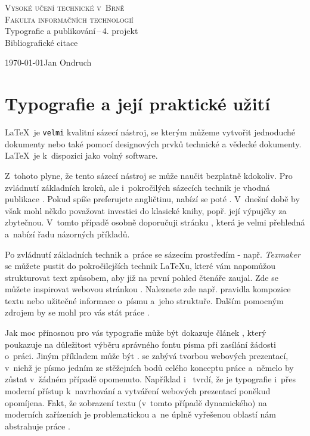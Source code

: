 \documentclass[11pt,a4paper,oneside]{article}
\begin{document}
\begin{titlepage}
\begin{center}

{\Huge\textsc{{Vysoké učení technické v~Brně}}}\\
\bigskip
{\huge\textsc{{Fakulta informačních technologií}}}\\
{\LARGE{Typografie a publikování\,--\,4. projekt}}\\
\medskip
{\Huge{Bibliografické citace}}
\end{center}		
\Large{\today \hfill Jan Ondruch}
\end{titlepage}

	\section*{Typografie a její praktické užití}
	\LaTeX~je \texttt{velmi} kvalitní sázecí nástroj, se kterým můžeme vytvořit jednoduché dokumenty nebo také pomocí designových prvků technické a vědecké dokumenty. \LaTeX~je k~dispozici jako volný software.
	
	Z~tohoto plyne, že tento sázecí nástroj se může naučit bezplatně kdokoliv. Pro zvládnutí základních kroků, ale i~pokročilých sázecích technik je vhodná publikace \cite{J_Rybicka_LPZ}. Pokud spíše preferujete angličtinu, nabízí se poté \cite{S_Kottwitz_LBG}. V~dnešní době by však mohl někdo považovat investici do klasické knihy, popř. její výpujčky za zbytečnou. V~tomto případě osobně doporučuji stránku \cite{uvod_ds_latex}, která je velmi přehledná a~nabízí řadu názorných příkladů.
	
	Po zvládnutí základních technik a~práce se sázecím prostředím - např. \emph{Texmaker} se můžete pustit do pokročilejších technik \LaTeX u, které vám napomůžou strukturovat text způsobem, aby již na první pohled čtenáře zaujal. Zde se můžete inspirovat webovou stránkou \cite{typomil}. Naleznete zde např. pravidla kompozice textu nebo užitečné informace o~písmu a~jeho struktuře. Dalším pomocným zdrojem by se mohl pro vás stát práce \cite{zlaty_rez}.
	
	Jak moc přínosnou pro vás typografie může být dokazuje článek \cite{wong_typography}, který poukazuje na důležitost výběru správného fontu písma při zasílání žádosti o~práci. Jiným příkladem může být \cite{berleant_proposal}. \cite{dig_typografie} se zabývá tvorbou webových prezentací, v~nichž je písmo jedním ze stěžejních bodů celého konceptu práce a~němelo by zůstat v~žádném případě opomenuto. Například i~\cite{web_typografie} tvrdí, že je typografie i~přes moderní přístup k~navrhování a vytváření webových prezentací poněkud opomíjena. Fakt, že zobrazení textu (v~tomto případě dynamického) na moderních zařízeních je problematickou a~ne úplně vyřešenou oblastí nám abstrahuje práce \cite{dyn_text}.

\newpage
\renewcommand{\refname}{Literatura}
	
	
\end{document}

